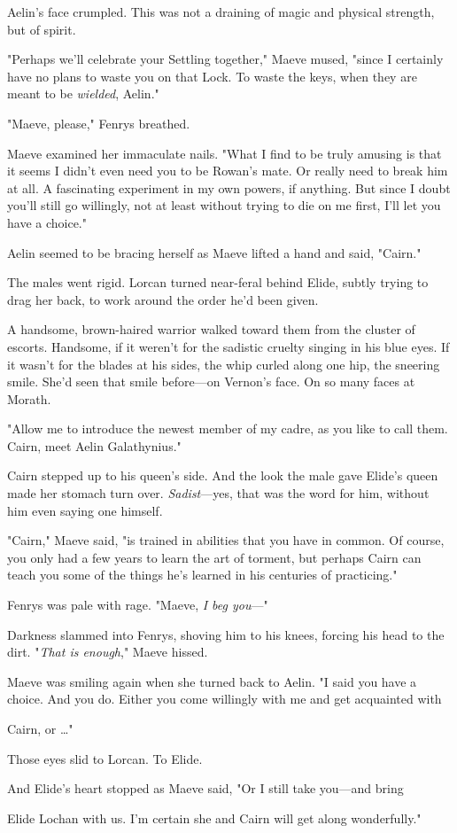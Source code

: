 Aelin's face crumpled. This was not a draining of magic and physical strength, but of spirit.

"Perhaps we'll celebrate your Settling together," Maeve mused, "since I certainly have no plans to waste you on that Lock. To waste the keys, when they are meant to be \emph{wielded}, Aelin."

"Maeve, please," Fenrys breathed.

Maeve examined her immaculate nails. "What I find to be truly amusing is that it seems I didn't even need you to be Rowan's mate. Or really need to break him at all. A fascinating experiment in my own powers, if anything. But since I doubt you'll still go willingly, not at least without trying to die on me first, I'll let you have a choice."

Aelin seemed to be bracing herself as Maeve lifted a hand and said, "Cairn."

The males went rigid. Lorcan turned near-feral behind Elide, subtly trying to drag her back, to work around the order he'd been given.

A handsome, brown-haired warrior walked toward them from the cluster of escorts. Handsome, if it weren't for the sadistic cruelty singing in his blue eyes. If it wasn't for the blades at his sides, the whip curled along one hip, the sneering smile. She'd seen that smile before---on Vernon's face. On so many faces at Morath.

"Allow me to introduce the newest member of my cadre, as you like to call them. Cairn, meet Aelin Galathynius."

Cairn stepped up to his queen's side. And the look the male gave Elide's queen made her stomach turn over. \emph{Sadist}---yes, that was the word for him, without him even saying one himself.

"Cairn," Maeve said, "is trained in abilities that you have in common. Of course, you only had a few years to learn the art of torment, but  perhaps Cairn can teach you some of the things he's learned in his centuries of practicing."

Fenrys was pale with rage. "Maeve, \emph{I beg you}---"

Darkness slammed into Fenrys, shoving him to his knees, forcing his head to the dirt. "\emph{That is enough}," Maeve hissed.

Maeve was smiling again when she turned back to Aelin. "I said you have a choice. And you do. Either you come willingly with me and get acquainted with

Cairn, or \ldots"

Those eyes slid to Lorcan. To Elide.

And Elide's heart stopped as Maeve said, "Or I still take you---and bring

Elide Lochan with us. I'm certain she and Cairn will get along wonderfully."
